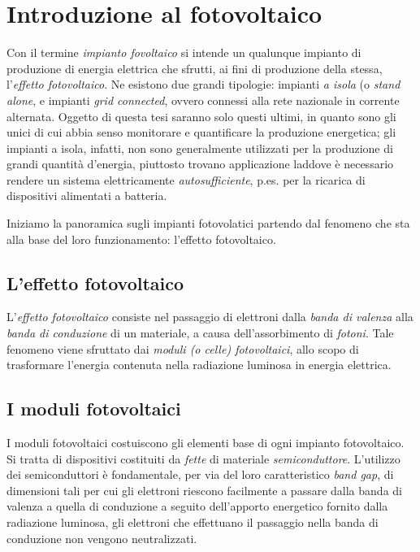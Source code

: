 \clearpage{\pagestyle{empty}\cleardoublepage}
\chapter{Introduzione al fotovoltaico}
%
Con il termine \emph{impianto fovoltaico} si intende un qualunque 
impianto di produzione di energia elettrica che sfrutti, ai fini 
di produzione della stessa, l'\emph{effetto fotovoltaico}.
%
Ne esistono due grandi tipologie: impianti \emph{a isola} (o \emph{stand alone}, 
e impianti \emph{grid connected}, ovvero connessi alla rete nazionale in 
corrente alternata.
%
Oggetto di questa tesi saranno solo questi ultimi, in quanto sono gli unici
di cui abbia senso monitorare e quantificare la produzione energetica; gli impianti 
a isola, infatti, non sono generalmente utilizzati per la produzione di grandi
quantit\`a d'energia, piuttosto trovano applicazione laddove \`e necessario
rendere un sistema elettricamente \emph{autosufficiente}, p.es. per la 
ricarica di dispositivi alimentati a batteria.
%

%
Iniziamo la panoramica sugli impianti fotovolatici partendo dal fenomeno
che sta alla base del loro funzionamento: l'effetto fotovoltaico.
%

%
\section{L'effetto fotovoltaico}
L'\emph{effetto fotovoltaico} consiste nel passaggio di elettroni 
dalla \emph{banda di valenza} alla \emph{banda di conduzione} di 
un materiale, a causa dell'assorbimento di \emph{fotoni}. 
%
Tale fenomeno viene sfruttato dai \emph{moduli (o celle) fotovoltaici}, 
allo scopo di trasformare l'energia contenuta nella radiazione luminosa 
in energia elettrica.
%

%
\section{I moduli fotovoltaici}
I moduli fotovoltaici costuiscono gli elementi base di ogni impianto
fotovoltaico. Si tratta di dispositivi costituiti da \emph{fette} di 
materiale \emph{semiconduttore}. L'utilizzo dei semiconduttori \`e 
fondamentale, per via del loro caratteristico \emph{band gap}, di 
dimensioni tali per cui  gli elettroni riescono facilmente 
a passare dalla banda di valenza a quella di conduzione a seguito 
dell'apporto energetico fornito dalla radiazione luminosa,  
gli elettroni che effettuano il passaggio nella banda di conduzione 
non vengono neutralizzati.
%


